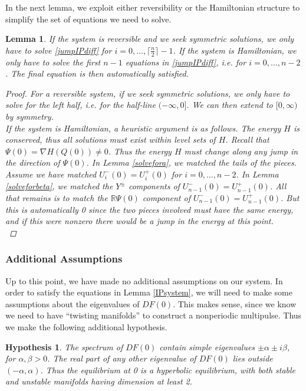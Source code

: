 \documentclass[12pt]{article}
\def\R{{\mathbb R}}
\newtheorem{lemma}{Lemma}
\newtheorem{hypothesis}{Hypothesis}
\begin{document}
In the next lemma, we exploit either reversibility or the Hamiltonian structure to simplify the set of equations we need to solve.

\begin{lemma}\label{IPsystemreduced}
If the system is reversible and we seek symmetric solutions, we only have to solve \eqref{jumpIPdiff} for $i = 0, \dots, \lceil \frac{n}{2} \rceil - 1$. If the system is Hamiltonian, we only have to solve the first $n-1$ equations in \eqref{jumpIPdiff}, i.e. for $i = 0, \dots, n-2$. The final equation is then automatically satisfied.

\begin{proof}
For a reversible system, if we seek symmetric solutions, we only have to solve for the left half, i.e. for the half-line $(-\infty, 0]$. We can then extend to $[0, \infty)$ by symmetry.\\

If the system is Hamiltonian, a heuristic argument is as follows. The energy $H$ is conserved, thus all solutions must exist within level sets of $H$. Recall that $\Psi(0) = \nabla H(Q(0)) \neq 0$. Thus the energy $H$ must change along any jump in the direction of $\Psi(0)$. In Lemma \ref{solvefora}, we matched the tails of the pieces. Assume we have matched $U_i^-(0) = U_i^+(0)$ for $i = 0, \dots, n-2$. In Lemma \ref{solveforbeta}, we matched the $Y^\pm$ components of $U_{n-1}^-(0) = U_{n-1}^+(0)$. All that remains is to match the $\R \Psi(0)$ component of $U_{n-1}^-(0) = U_{n-1}^+(0)$. But this is automatically 0 since the two pieces involved must have the same energy, and if this were nonzero there would be a jump in the energy at this point.\\
\end{proof}
\end{lemma}

\subsubsection{Additional Assumptions}

Up to this point, we have made no additional assumptions on our system. In order to satisfy the equations in Lemma \ref{IPsystem}, we will need to make some assumptions about the eigenvalues of $DF(0)$. This makes sense, since we know we need to have ``twisting manifolds'' to construct a nonperiodic multipulse. Thus we make the following additional hypothesis.

\begin{hypothesis}\label{spechyp}
The spectrum of $DF(0)$ contain simple eigenvalues $\pm \alpha \pm i \beta$, for $\alpha, \beta > 0$. The real part of any other eigenvalue of $DF(0)$ lies outside $(-\alpha, \alpha)$. Thus the equilibrium at 0 is a hyperbolic equilibrium, with both stable and unstable manifolds having dimension at least 2.
\end{hypothesis}
\end{document}
